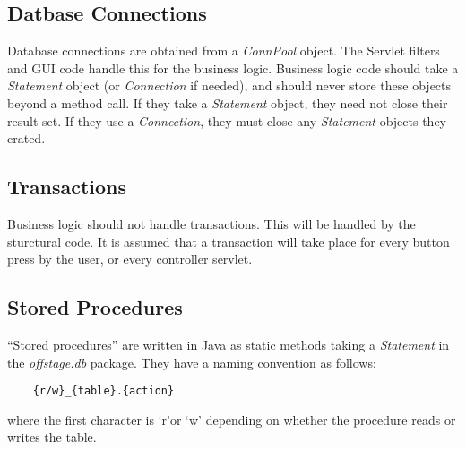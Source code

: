 \documentclass[11pt]{article}
\begin{document}
\subsection{Datbase Connections}

Database connections are obtained from a \emph{ConnPool} object.  The Servlet filters and GUI code handle this for the business logic.  Business logic code should take a \emph{Statement} object (or \emph{Connection} if needed), and should never store these objects beyond a method call.  If they take a \emph{Statement} object, they need not close their result set.  If they use a \emph{Connection}, they must close any \emph{Statement} objects they crated.

\subsection{Transactions}

Business logic should not handle transactions.  This will be handled by the sturctural code.  It is assumed that a transaction will take place for every button press by the user, or every controller servlet.

\subsection{Stored Procedures}

``Stored procedures'' are written in Java as static methods taking a \emph{Statement} in the \emph{offstage.db} package.  They have a naming convention as follows:
\begin{verbatim}
    {r/w}_{table}.{action}
\end{verbatim}
 where the first character is `r'or `w' depending on whether the procedure reads or writes the table.
\end{document}
